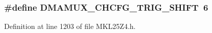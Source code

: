 \subsubsection[{\texorpdfstring{D\+M\+A\+M\+U\+X\+\_\+\+C\+H\+C\+F\+G\+\_\+\+T\+R\+I\+G\+\_\+\+S\+H\+I\+FT}{DMAMUX_CHCFG_TRIG_SHIFT}}]{\setlength{\rightskip}{0pt plus 5cm}\#define D\+M\+A\+M\+U\+X\+\_\+\+C\+H\+C\+F\+G\+\_\+\+T\+R\+I\+G\+\_\+\+S\+H\+I\+FT~6}\hypertarget{group___d_m_a_m_u_x___register___masks_ga714a6b142fde49d701e3f624bb2417e1}{}\label{group___d_m_a_m_u_x___register___masks_ga714a6b142fde49d701e3f624bb2417e1}


Definition at line 1203 of file M\+K\+L25\+Z4.\+h.


